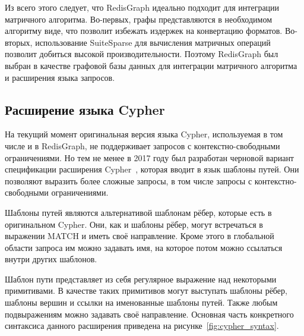 \documentclass[14pt]{matmex-diploma-custom}
\begin{document}
Из всего этого следует, что RedisGraph идеально подходит для интеграции матричного алгоритма. Во-первых, графы представляются в необходимом алгоритму виде, что позволит избежать издержек на конвертацию форматов. Во-вторых, использование SuiteSparse для вычисления матричных операций позволит добиться высокой производительности. Поэтому RedisGraph был выбран в качестве графовой базы данных для интеграции матричного алгоритма и расширения языка запросов.


\subsection{Расширение языка Cypher}\label{subsection:cypher-extention}
На текущий момент оригинальная версия языка Cypher, используемая в том числе и в RedisGraph, не поддерживает запросов с контекстно-свободными ограничениями. Но тем не менее в 2017 году был разработан черновой вариант спецификации расширения Cypher~\cite{cypher-specification}, которая вводит в язык шаблоны путей. Они позволяют выразить более сложные запросы, в том числе запросы с контекстно-свободными ограничениями.

Шаблоны путей являются альтернативой шаблонам рёбер, которые есть в оригинальном Cypher. Они, как и шаблоны рёбер, могут встречаться в выражении MATCH и иметь своё направление. Кроме этого в глобальной области запроса им можно задавать имя, на которое потом можно ссылаться внутри других шаблонов.

Шаблон пути представляет из себя регулярное выражение над некоторыми примитивами. В качестве таких примитивов могут выступать шаблоны рёбер, шаблоны вершин и ссылки на именованные шаблоны путей. Также любым подвыражениям можно задавать своё направление. Основная часть конкретного синтаксиса данного расширения приведена на рисунке~\ref{fig:cypher_syntax}.
\end{document}
